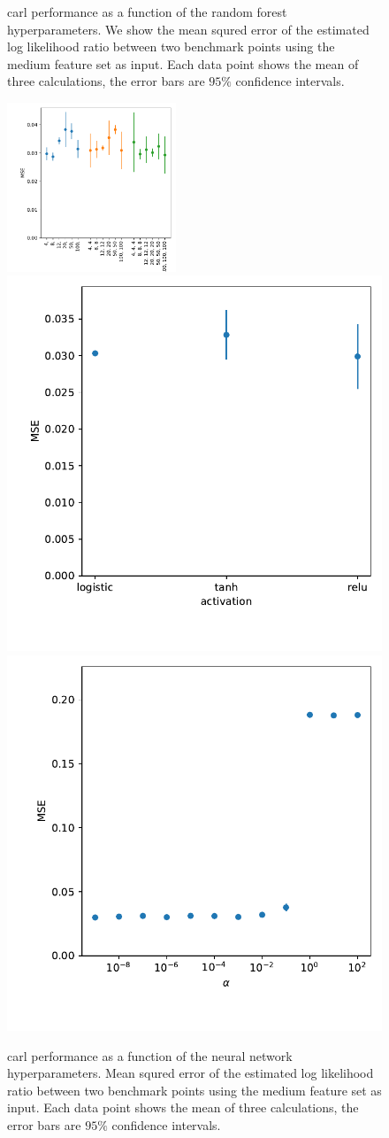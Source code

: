 \begin{figure}
  \caption{carl performance as a function of the random forest
    hyperparameters. We show the mean squred error of the estimated
    log likelihood ratio between two benchmark points using the medium
    feature set as input. Each data point shows the mean of three
    calculations, the error bars are $95\%$ confidence intervals.}
  \label{fig:pointwise_tuning_smart_rf_tuning}
\end{figure}

\begin{figure}
  \includegraphics[width=0.45\textwidth]{figures/appendix/pointwise_tuning_full/mse_smart_mlp_hidden_layer_sizes.pdf}%
  \includegraphics[height=0.45\textwidth]{figures/appendix/pointwise_tuning_full/mse_smart_mlp_activation.pdf}\\%
  \includegraphics[height=0.45\textwidth]{figures/appendix/pointwise_tuning_full/mse_smart_mlp_alpha.pdf}%
  \caption{carl performance as a function of the neural network
  hyperparameters. Mean squred error of the estimated log likelihood
  ratio between two benchmark points using the medium feature set as
  input. Each data point shows the mean of three calculations, the
  error bars are $95\%$ confidence intervals.}
  \label{fig:pointwise_tuning_smart_mlp_tuning}
\end{figure}

